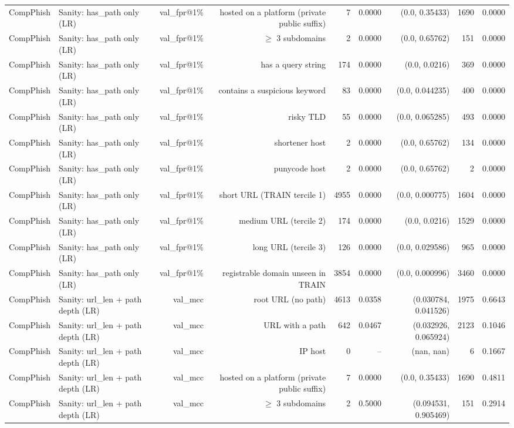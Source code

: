 \begin{table}[t]
\begin{tabular}{llrrrrrrr}
CompPhish & Sanity: has\_path only (LR) & val\_fpr@1\% & hosted on a platform (private public suffix) & 7 & 0.0000 & (0.0, 0.35433) & 1690 & 0.0000 \\
CompPhish & Sanity: has\_path only (LR) & val\_fpr@1\% & $\geq$ 3 subdomains & 2 & 0.0000 & (0.0, 0.65762) & 151 & 0.0000 \\
CompPhish & Sanity: has\_path only (LR) & val\_fpr@1\% & has a query string & 174 & 0.0000 & (0.0, 0.0216) & 369 & 0.0000 \\
CompPhish & Sanity: has\_path only (LR) & val\_fpr@1\% & contains a suspicious keyword & 83 & 0.0000 & (0.0, 0.044235) & 400 & 0.0000 \\
CompPhish & Sanity: has\_path only (LR) & val\_fpr@1\% & risky TLD & 55 & 0.0000 & (0.0, 0.065285) & 493 & 0.0000 \\
CompPhish & Sanity: has\_path only (LR) & val\_fpr@1\% & shortener host & 2 & 0.0000 & (0.0, 0.65762) & 134 & 0.0000 \\
CompPhish & Sanity: has\_path only (LR) & val\_fpr@1\% & punycode host & 2 & 0.0000 & (0.0, 0.65762) & 2 & 0.0000 \\
CompPhish & Sanity: has\_path only (LR) & val\_fpr@1\% & short URL (TRAIN tercile 1) & 4955 & 0.0000 & (0.0, 0.000775) & 1604 & 0.0000 \\
CompPhish & Sanity: has\_path only (LR) & val\_fpr@1\% & medium URL (tercile 2) & 174 & 0.0000 & (0.0, 0.0216) & 1529 & 0.0000 \\
CompPhish & Sanity: has\_path only (LR) & val\_fpr@1\% & long URL (tercile 3) & 126 & 0.0000 & (0.0, 0.029586) & 965 & 0.0000 \\
CompPhish & Sanity: has\_path only (LR) & val\_fpr@1\% & registrable domain unseen in TRAIN & 3854 & 0.0000 & (0.0, 0.000996) & 3460 & 0.0000 \\
CompPhish & Sanity: url\_len + path depth (LR) & val\_mcc & root URL (no path) & 4613 & 0.0358 & (0.030784, 0.041526) & 1975 & 0.6643 \\
CompPhish & Sanity: url\_len + path depth (LR) & val\_mcc & URL with a path & 642 & 0.0467 & (0.032926, 0.065924) & 2123 & 0.1046 \\
CompPhish & Sanity: url\_len + path depth (LR) & val\_mcc & IP host & 0 & -- & (nan, nan) & 6 & 0.1667 \\
CompPhish & Sanity: url\_len + path depth (LR) & val\_mcc & hosted on a platform (private public suffix) & 7 & 0.0000 & (0.0, 0.35433) & 1690 & 0.4811 \\
CompPhish & Sanity: url\_len + path depth (LR) & val\_mcc & $\geq$ 3 subdomains & 2 & 0.5000 & (0.094531, 0.905469) & 151 & 0.2914 \\

\end{tabular}
\end{table}
